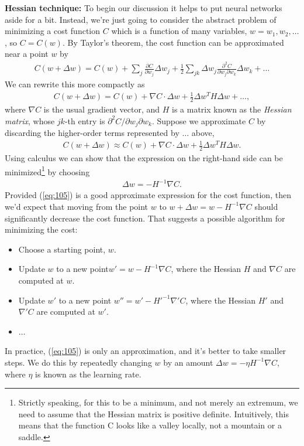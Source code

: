 \documentclass[a4paper,twoside,10pt]{book}
\begin{document}
\textbf{Hessian technique:} To begin our discussion it helps to put neural networks aside for a bit. Instead, we're just going to consider the abstract problem of minimizing a cost function $C$ which is a function of many variables, $w=w_1,w_2,\ldots$, so $C=C(w)$. By Taylor's theorem, the cost function can be approximated near a point $w$ by
\begin{eqnarray}
C(w+\Delta w)  =  C(w) + \sum_j \frac{\partial C}{\partial w_j} \Delta w_j + \frac{1}{2} \sum_{jk} \Delta w_j \frac{\partial^2 C}{\partial w_j \partial w_k} \Delta w_k + \ldots
\label{eq:103}
\end{eqnarray}
We can rewrite this more compactly as
\begin{eqnarray}
C(w+\Delta w) = C(w) + \nabla C \cdot \Delta w + \frac{1}{2} \Delta w^T H \Delta w + \ldots,
\label{eq:104}
\end{eqnarray}
where $\nabla C$ is the usual gradient vector, and $H$ is a matrix known as the \textit{Hessian matrix}, whose $jk$-th entry is $\partial^2C / \partial w_j \partial w_k$. Suppose we approximate $C$ by discarding the higher-order terms represented by $\ldots$ above,
\begin{eqnarray} 
C(w+\Delta w) \approx C(w) + \nabla C \cdot \Delta w + \frac{1}{2} \Delta w^T H \Delta w.
\label{eq:105}
\end{eqnarray}
Using calculus we can show that the expression on the right-hand side can be minimized\footnote{Strictly speaking, for this to be a minimum, and not merely an extremum, we need to assume that the Hessian matrix is positive definite. Intuitively, this means that the function C looks like a valley locally, not a mountain or a saddle.} by choosing
\begin{eqnarray}
\Delta w = -H^{-1} \nabla C.
\label{eq:106}
\end{eqnarray}
Provided (\ref{eq:105}) is a good approximate expression for the cost function, then we'd expect that moving from the point $w$ to $w+\Delta w = w-H^{-1} \nabla C$ should significantly decrease the cost function. That suggests a possible algorithm for minimizing the cost:
\begin{itemize}
\item Choose a starting point, $w$.
\item Update $w$ to a new point$w' = w-H^{-1} \nabla C$, where the Hessian $H$ and $\nabla C$ are computed at $w$.
\item Update $w'$ to a new point $w''=w'−H'^{−1}\nabla'C$, where the Hessian $H'$ and $\nabla'C$ are computed at $w'$.
\item $\ldots$
\end{itemize}
In practice, (\ref{eq:105}) is only an approximation, and it's better to take smaller steps. We do this by repeatedly changing $w$ by an amount $\Delta w = -\eta H^{-1}\nabla C$, where $\eta$ is known as the learning rate.
\end{document}
